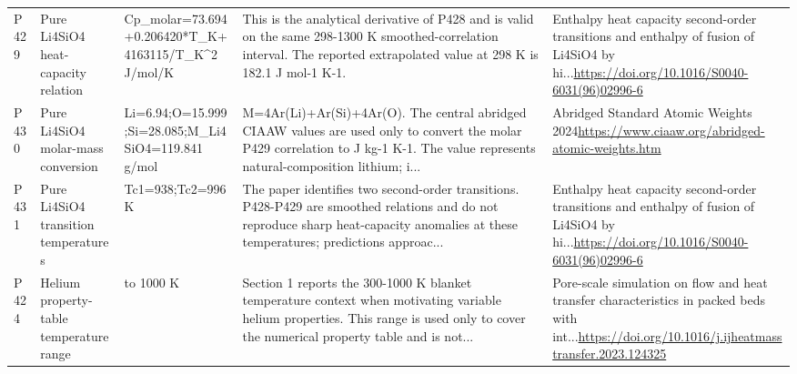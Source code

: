 \begin{longtable}{>{\raggedright\arraybackslash}p{1.05cm}>{\raggedright\arraybackslash}p{2.45cm}>{\raggedright\arraybackslash}p{2.65cm}>{\raggedright\arraybackslash}p{3.65cm}>{\raggedright\arraybackslash}p{5.25cm}}
P429 & Pure Li4SiO4 heat-capacity relation & Cp\_\allowbreak{}molar=\allowbreak{}73.694+0.206420*T\_\allowbreak{}K+4163115/\allowbreak{}T\_\allowbreak{}K\textasciicircum{}2 J/\allowbreak{}mol/\allowbreak{}K & This is the analytical derivative of P428 and is valid on the same 298-1300 K smoothed-correlation interval. The reported extrapolated value at 298 K is 182.1 J mol-1 K-1. & Enthalpy heat capacity second-order transitions and enthalpy of fusion of Li4SiO4 by hi...\newline \url{https://doi.org/10.1016/S0040-6031(96)02996-6} \\
P430 & Pure Li4SiO4 molar-mass conversion & Li=\allowbreak{}6.94;\allowbreak{}O=\allowbreak{}15.999;\allowbreak{}Si=\allowbreak{}28.085;\allowbreak{}M\_\allowbreak{}Li4SiO4=\allowbreak{}119.841 g/\allowbreak{}mol & M=\allowbreak{}4Ar(\allowbreak{}Li)+Ar(\allowbreak{}Si)+4Ar(\allowbreak{}O). The central abridged CIAAW values are used only to convert the molar P429 correlation to J kg-1 K-1. The value represents natural-composition lithium;\allowbreak{} i... & Abridged Standard Atomic Weights 2024\newline \url{https://www.ciaaw.org/abridged-atomic-weights.htm} \\
P431 & Pure Li4SiO4 transition temperatures & Tc1=\allowbreak{}938;\allowbreak{}Tc2=\allowbreak{}996 K & The paper identifies two second-order transitions. P428-P429 are smoothed relations and do not reproduce sharp heat-capacity anomalies at these temperatures;\allowbreak{} predictions approac... & Enthalpy heat capacity second-order transitions and enthalpy of fusion of Li4SiO4 by hi...\newline \url{https://doi.org/10.1016/S0040-6031(96)02996-6} \\
P424 & Helium property-table temperature range & 300 to 1000 K & Section 1 reports the 300-1000 K blanket temperature context when motivating variable helium properties. This range is used only to cover the numerical property table and is not... & Pore-scale simulation on flow and heat transfer characteristics in packed beds with int...\newline \url{https://doi.org/10.1016/j.ijheatmasstransfer.2023.124325} \\
\end{longtable}
\endgroup
